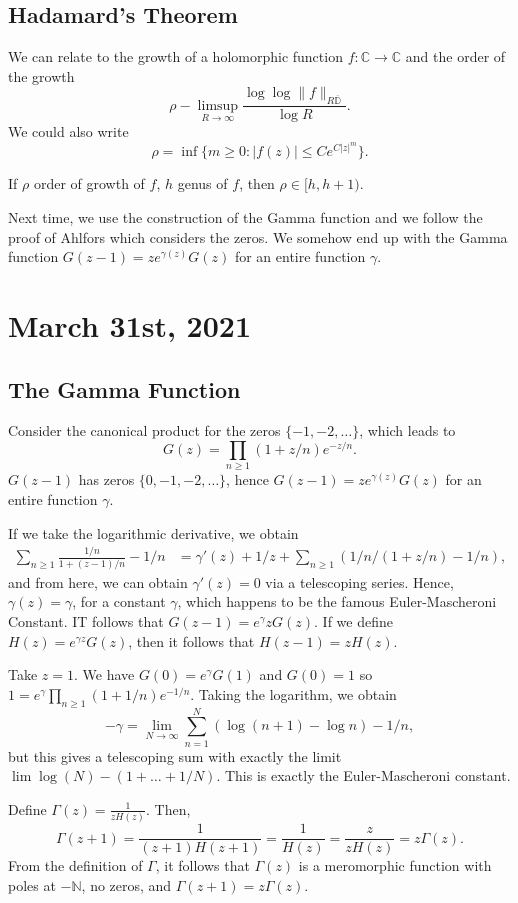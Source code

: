 \documentclass[12pt]{scrartcl}
\newcommand{\N}{\mathbb{N}}
\newcommand{\C}{\mathbb C}
\newcommand{\D}{\mathbb D}
\let \ol \overline
\begin{document}
\subsection{Hadamard's Theorem}
We can relate to the growth of a holomorphic function $f: \C \to \C$ and the order of the growth 
$$\rho - \limsup_{R \to \infty} \frac{\log \log \|f\|_{R\ol{\D}}}{\log R}.$$
We could also write
$$\rho = \inf \{m \ge 0: |f(z)| \le Ce^{C|z|^m}\}.$$
\begin{theorem}[Hadamard] If $\rho$ order of growth of $f$, $h$ genus of $f$, then $\rho \in [h, h+1)$.
\end{theorem}
Next time, we use the construction of the Gamma function and we follow the proof of Ahlfors which considers the zeros.  We somehow end up with the Gamma function $G(z-1) = ze^{\gamma(z)}G(z)$ for an entire function $\gamma$.  

\pagebreak
\section{March 31st, 2021}
\subsection{The Gamma Function}
Consider the canonical product for the zeros $\{-1, -2, \dots\}$, which leads to
$$G(z) = \prod_{n \ge 1} (1 + z/n) e^{-z/n}.$$
$G(z-1)$ has zeros $\{0, -1, -2, \dots\}$, hence $G(z-1)=ze^{\gamma(z)}G(z)$ for an entire function $\gamma$.

If we take the logarithmic derivative, we obtain
\begin{align*}
\sum_{n \ge 1} \frac{1/n}{1 + (z-1)/n} - 1/n &= \gamma'(z) + 1/z + \sum_{n \ge 1} (1/n / (1 + z/n) - 1/n),
\end{align*}
and from here, we can obtain $\gamma'(z) = 0$ via a telescoping series.  Hence, $\gamma(z) = \gamma$, for a constant $\gamma$, which happens to be the famous Euler-Mascheroni Constant.  IT follows that $G(z-1) = e^{\gamma}z G(z)$.  If we define $H(z) = e^{\gamma z} G(z)$, then it follows that $H(z-1) = zH(z)$.

Take $z=1$.  We have $G(0) = e^\gamma G(1)$ and $G(0) = 1$ so $1 = e^\gamma \prod_{n \ge 1} (1 + 1/n) e^{-1/n}$.  Taking the logarithm, we obtain $$-\gamma = \lim_{N \to \infty} \sum_{n=1}^N (\log (n+1) - \log n) - 1/n,$$ but this gives a telescoping sum with exactly the limit $\lim \log(N) - (1 + \dots + 1/N)$.  This is exactly the Euler-Mascheroni constant.  

Define $\Gamma(z) = \frac{1}{zH(z)}$.  Then, $$\Gamma(z+1) = \frac{1}{(z+1)H(z+1)} = \frac{1}{H(z)} = \frac{z}{zH(z)} = z\Gamma(z).$$
From the definition of $\Gamma$, it follows that $\Gamma(z)$ is a meromorphic function with poles at $-\N$, no zeros, and $\Gamma(z+1) = z\Gamma(z)$.
\end{document}
